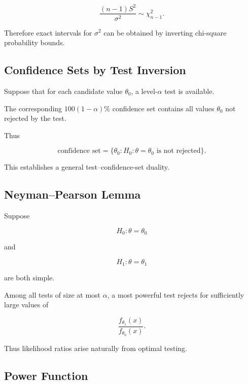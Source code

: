 \[
\boxed{
\frac{
(n-1)S^2
}{
\sigma^2
}
\sim
\chi^2_{n-1}.
}
\]

Therefore exact intervals for \(\sigma^2\) can be obtained by inverting
chi-square probability bounds.

\subsection{Confidence Sets by Test Inversion}
\label{subsec:confidence-set-test-inversion}

Suppose that for each candidate value \(\theta_0\), a level-\(\alpha\)
test is available.

The corresponding \(100(1-\alpha)\%\) confidence set contains all values
\(\theta_0\) not rejected by the test.

Thus

\[
\boxed{
\text{confidence set}
=
\{
\theta_0:
H_0:\theta=\theta_0
\text{ is not rejected}
\}.
}
\]

This establishes a general test--confidence-set duality.

\subsection{Neyman--Pearson Lemma}
\label{subsec:neyman-pearson-mathstat}

Suppose

\[
H_0:\theta=\theta_0
\]

and

\[
H_1:\theta=\theta_1
\]

are both simple.

\begin{theorem}
Among all tests of size at most \(\alpha\), a most powerful test rejects
for sufficiently large values of

\[
\boxed{
\frac{
f_{\theta_1}(x)
}{
f_{\theta_0}(x)
}.
}
\]
\end{theorem}

Thus likelihood ratios arise naturally from optimal testing.

\subsection{Power Function}
\label{subsec:power-function-mathstat}

